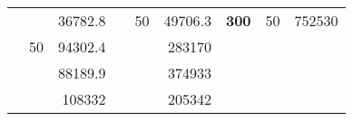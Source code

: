 \begin{table}[H]
\begin{tabular}{|ccrccrccc}
\rowcolor[HTML]{DDFDFF} 
\multicolumn{1}{|c|}{\cellcolor[HTML]{FFFFC7}}                                & \multicolumn{1}{c|}{\cellcolor[HTML]{DDFDFF}}                      & \multicolumn{1}{r|}{\cellcolor[HTML]{DAE8FC}36782.8}   & \multicolumn{1}{c|}{\cellcolor[HTML]{FFFFC7}}                                & \multicolumn{1}{c|}{\multirow{-10}{*}{\cellcolor[HTML]{DDFDFF}50}}  & \multicolumn{1}{r|}{\cellcolor[HTML]{DDFDFF}49706.3}   & \multicolumn{1}{c|}{\multirow{-19}{*}{\cellcolor[HTML]{FFFFC7}\textbf{300}}} & \multicolumn{1}{c|}{\multirow{-10}{*}{\cellcolor[HTML]{DDFDFF}50}} & \multicolumn{1}{r|}{\cellcolor[HTML]{DDFDFF}752530}    \\ \cline{3-3} \cline{5-9} 
\multicolumn{1}{|c|}{\cellcolor[HTML]{FFFFC7}}                                & \multicolumn{1}{c|}{\multirow{-10}{*}{\cellcolor[HTML]{DDFDFF}50}} & \multicolumn{1}{r|}{\cellcolor[HTML]{DDFDFF}94302.4}   & \multicolumn{1}{c|}{\cellcolor[HTML]{FFFFC7}}                                & \multicolumn{1}{c|}{\cellcolor[HTML]{DAE8FC}}                       & \multicolumn{1}{r|}{\cellcolor[HTML]{DAE8FC}283170}    &                                                                              &                                                                    &                                                        \\ \cline{2-3} \cline{6-6}
\multicolumn{1}{|c|}{\cellcolor[HTML]{FFFFC7}}                                & \multicolumn{1}{c|}{\cellcolor[HTML]{DAE8FC}}                      & \multicolumn{1}{r|}{\cellcolor[HTML]{DAE8FC}88189.9}   & \multicolumn{1}{c|}{\cellcolor[HTML]{FFFFC7}}                                & \multicolumn{1}{c|}{\cellcolor[HTML]{DAE8FC}}                       & \multicolumn{1}{r|}{\cellcolor[HTML]{DDFDFF}374933}    &                                                                              &                                                                    &                                                        \\ \cline{3-3} \cline{6-6}
\multicolumn{1}{|c|}{\cellcolor[HTML]{FFFFC7}}                                & \multicolumn{1}{c|}{\cellcolor[HTML]{DAE8FC}}                      & \multicolumn{1}{r|}{\cellcolor[HTML]{DDFDFF}108332}    & \multicolumn{1}{c|}{\cellcolor[HTML]{FFFFC7}}                                & \multicolumn{1}{c|}{\cellcolor[HTML]{DAE8FC}}                       & \multicolumn{1}{r|}{\cellcolor[HTML]{DAE8FC}205342}    &                                                                              &                                                                    &                                                        \\ \cline{3-3} \cline{6-6}

\end{tabular}
\end{table}
